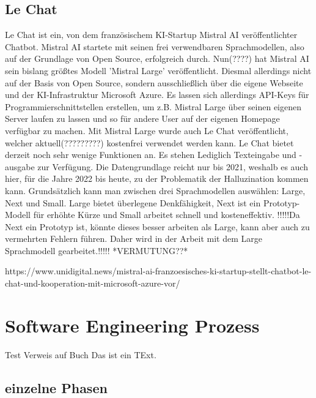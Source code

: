 \subsection{Le Chat}  \label{Le Chat}

Le Chat ist ein, von dem französischem KI-Startup Mistral AI veröffentlichter Chatbot. Mistral AI startete mit  
seinen frei verwendbaren Sprachmodellen, also auf der Grundlage von Open Source, erfolgreich durch. Nun(????)  
hat Mistral AI sein bislang größtes Modell 'Mistral Large' veröffentlicht. Diesmal allerdings nicht auf der  
Basis von Open Source, sondern ausschließlich über die eigene Webseite und der KI-Infrastruktur Microsoft  
Azure. Es lassen sich allerdings API-Keys für Programmierschnittstellen erstellen, um z.B. Mistral Large über  
seinen eigenen Server laufen zu lassen und so für andere User auf der eigenen Homepage verfügbar zu machen.  
Mit Mistral Large wurde auch Le Chat veröffentlicht, welcher aktuell(?????????) kostenfrei verwendet werden kann.
Le Chat bietet derzeit noch sehr wenige Funktionen an. Es stehen Lediglich Texteingabe und -ausgabe zur Verfügung.  
Die Datengrundlage reicht nur bis 2021, weshalb es auch hier, für die Jahre 2022 bis heute, zu der Problematik der  
Halluzination kommen kann.
Grundsätzlich kann man zwischen drei Sprachmodellen auswählen: Large, Next und Small. Large bietet überlegene Denkfähigkeit,  
Next ist ein Prototyp-Modell für erhöhte Kürze und Small arbeitet schnell und kosteneffektiv. !!!!!Da Next ein Prototyp ist, könnte  
dieses besser arbeiten als Large, kann aber auch zu vermehrten Fehlern führen. Daher wird in der Arbeit mit dem Large  
Sprachmodell gearbeitet.!!!!! *VERMUTUNG??*


https://www.unidigital.news/mistral-ai-franzoesisches-ki-startup-stellt-chatbot-le-chat-und-kooperation-mit-microsoft-azure-vor/

\section{Software Engineering Prozess}
Test Verweis auf Buch \cite{Sommerville10} Das ist ein TExt.
\subsection{einzelne Phasen}  \label{einzelne Phasen}
